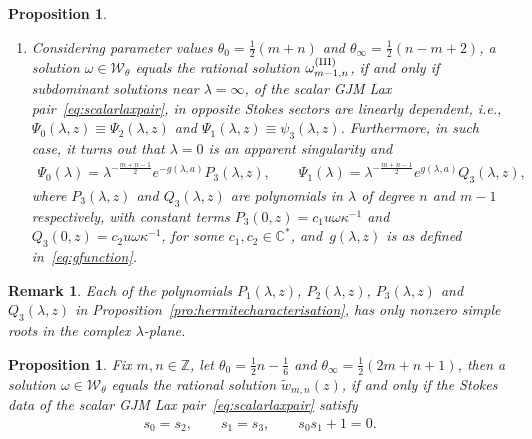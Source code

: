 \documentclass[pdftex]{sigma}
\numberwithin{equation}{section}
\newtheorem{pro}[thm]{Proposition}
\newtheorem{rem}[thm]{Remark}
\newcommand{\om}{\omega}
\newcommand{\la}{\lambda}
\begin{document}
\begin{pro}
\begin{enumerate}[label={\rm H.\Roman*:}, ref={\rm H.\Roman*}]
\item Considering parameter values $\theta_0=\tfrac{1}{2}(m+n)$ and $\theta_\infty=\tfrac{1}{2}(n-m+2)$, a solution $\om\in \mathcal{W}_\theta$ equals the rational solution $\om_{m-1,n}^{({\rm III})}$, if and only if subdominant solutions near $\lambda=\infty$, of the scalar GJM Lax pair~\eqref{eq:scalarlaxpair}, in
		opposite Stokes sectors are linearly dependent, i.e., $\Psi_0(\lambda,z)\equiv \Psi_2(\lambda,z)$ and $\Psi_1(\lambda,z)\equiv \psi_3(\lambda,z)$.			
		Furthermore, in such case, it turns out that $\lambda=0$ is an apparent singularity and
		\begin{gather*}%
		\Psi_0(\lambda)=\lambda^{-\frac{m+n-1}{2}}e^{-g(\lambda,a)}P_3(\lambda,z),\qquad \Psi_1(\lambda)=\lambda^{-\frac{m+n-1}{2}}e^{g(\lambda,a)}Q_3(\lambda,z),
		\end{gather*}
		where $P_3(\lambda,z)$ and $Q_3(\lambda,z)$ are polynomials in $\lambda$ of degree $n$ and $m-1$ respectively, with constant terms $P_3(0,z)=c_1 u\om\kappa^{-1}$ and $Q_3(0,z)=c_2 u\om\kappa^{-1}$, for some $c_1,c_2\in\mathbb{C}^*$,
		and~$g(\la,z)$ is as defined in~\eqref{eq:gfunction}. 	\label{H3general}
	\end{enumerate}
\end{pro}
\begin{rem}\label{rem:simple}
Each of the polynomials $P_1(\lambda,z)$, $P_2(\lambda,z)$, $P_3(\lambda,z)$ and $Q_3(\lambda,z)$ in Proposi\-tion~\ref{pro:hermitecharacterisation}, has only nonzero simple roots in the complex $\lambda$-plane.
\end{rem}

\begin{pro}\label{pro:okamotoanharmonicgeneral}
Fix $m,n\in\mathbb{Z}$, let $\theta_0=\tfrac{1}{2}n-\tfrac{1}{6}$ and $\theta_\infty=\tfrac{1}{2}(2m+n+1)$, then a solution $\om\in \mathcal{W}_\theta$ equals the rational solution $\widetilde{w}_{m,n}(z)$, if and only if the Stokes data of the scalar GJM Lax pair~\eqref{eq:scalarlaxpair} satisfy
	\begin{gather*}
	s_0=s_2,\qquad s_1=s_3,\qquad s_0s_1+1=0.
	\end{gather*}
\end{pro}
\end{document}
